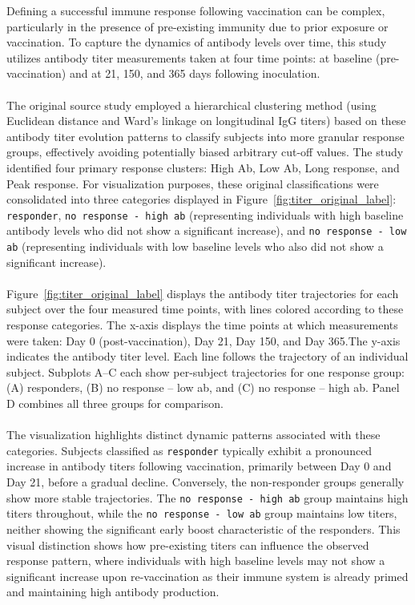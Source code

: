 \documentclass[12pt,a4paper]{report}
\begin{document}
\noindent
Defining a successful immune response following vaccination can be complex, particularly in the presence of pre-existing immunity due to prior exposure or vaccination. To capture the dynamics of antibody levels over time, this study utilizes antibody titer measurements taken at four time points: at baseline (pre-vaccination) and at 21, 150, and 365 days following inoculation.\\
\\
The original source study \cite{bartholomeus2020transcriptomic} employed a hierarchical clustering method (using Euclidean distance and Ward's linkage on longitudinal IgG titers) based on these antibody titer evolution patterns to classify subjects into more granular response groups, effectively avoiding potentially biased arbitrary cut-off values. The study identified four primary response clusters: High Ab, Low Ab, Long response, and Peak response.
For visualization purposes, these original classifications were consolidated into three categories displayed in Figure~\ref{fig:titer_original_label}: \texttt{responder}, \texttt{no response - high ab} (representing individuals with high baseline antibody levels who did not show a significant increase), and \texttt{no response - low ab} (representing individuals with low baseline levels who also did not show a significant increase).\\
\\
Figure~\ref{fig:titer_original_label} displays the antibody titer trajectories for each subject over the four measured time points, with lines colored according to these response categories. The x-axis displays the time points at which measurements were taken: Day 0 (post-vaccination), Day 21, Day 150, and Day 365.The y-axis indicates the antibody titer level. Each line follows the trajectory of an individual subject. Subplots A–C each show per-subject trajectories for one response group: (A) responders, (B) no response – low ab, and (C) no response – high ab. Panel D combines all three groups for comparison.\\
\\
The visualization highlights distinct dynamic patterns associated with these categories. Subjects classified as \texttt{responder} typically exhibit a pronounced increase in antibody titers following vaccination, primarily between Day 0 and Day 21, before a gradual decline. Conversely, the non-responder groups generally show more stable trajectories. The \texttt{no response - high ab} group maintains high titers throughout, while the \texttt{no response - low ab} group maintains low titers, neither showing the significant early boost characteristic of the responders. This visual distinction shows how pre-existing titers can influence the observed response pattern, where individuals with high baseline levels may not show a significant increase upon re-vaccination as their immune system is already primed and maintaining high antibody production.\\
\end{document}
